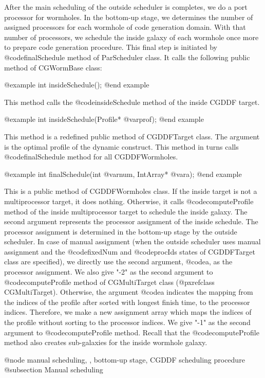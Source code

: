 {After the main scheduling of the outside scheduler is completes, we do a
port processor for wormholes. In the bottom-up stage, we determines the
number of assigned processors for each wormhole of code generation domain.
With that number of processors, we schedule the inside galaxy of each wormhole
once more to prepare code generation procedure. This final step is
initiated by @code{finalSchedule} method of ParScheduler class. It
calls the following public method of CGWormBase class:

@example
int insideSchedule();
@end example

This method calls the @code{insideSchedule} method of the inside CGDDF target.

@example
int insideSchedule(Profile* @var{prof});
@end example

This method is a redefined public method of CGDDFTarget class. The argument is
the optimal profile of the dynamic construct. This method in turns calls
@code{finalSchedule} method for all CGDDFWormholes.

@example
int finalSchedule(int @var{num}, IntArray* @var{a});
@end example

This is a public method of CGDDFWormholes class. If the inside target is
not a multiprocessor target, it does nothing. Otherwise, it calls
@code{computeProfile} method of the inside multiprocessor target to
schedule the inside galaxy. The second argument represents the
processor assignment of the inside schedule. The processor assignment
is determined in the bottom-up stage by the outside scheduler.
In case of manual assignment (when the outside scheduler uses manual
assignment and the @code{fixedNum} and @code{procIds} states of CGDDFTarget
class are specified), we directly use the second argument, @code{a}, as the
processor assignment. We also give "-2" as the second argument to 
@code{computeProfile} method of CGMultiTarget class 
(@pxref{class CGMultiTarget}). 
Otherwise, the argument @code{a} indicates the mapping from
the indices of the profile after sorted with longest finish time, to the
processor indices. Therefore, we make a new assignment array which maps
the indices of the profile without sorting to the processor indices.
We give "-1" as the second argument to @code{computeProfile} method.
Recall that the @code{computeProfile} method also creates sub-galaxies
for the inside wormhole galaxy. 

@node manual scheduling, , bottom-up stage, CGDDF scheduling procedure
@subsection Manual scheduling

}
